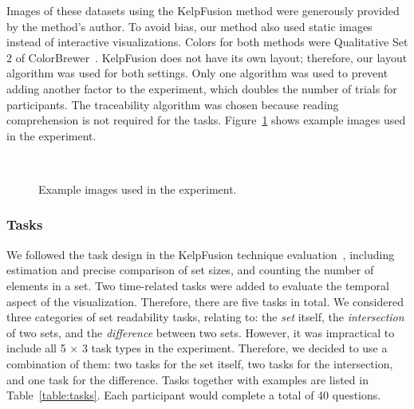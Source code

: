 
Images of these datasets using the KelpFusion method were generously provided by the method's author. To avoid bias, our method also used static images instead of interactive visualizations. Colors for both methods were Qualitative Set 2 of ColorBrewer~\cite{Harrower2003}. KelpFusion does not have its own layout; therefore, our layout algorithm was used for both settings. Only one algorithm was used to prevent adding another factor to the experiment, which doubles the number of trials for participants. The traceability algorithm was chosen because reading comprehension is not required for the tasks. Figure~\ref{fig:evaluation} shows example images used in the experiment. 

\begin{figure}[!htb]
	\centering
	\\
	\caption{Example images used in the experiment.}
	\label{fig:evaluation}
\end{figure}

\subsubsection{Tasks} We followed the task design in the KelpFusion technique evaluation~\cite{Meulemans2013}, including estimation and precise comparison of set sizes, and counting the number of elements in a set. Two time-related tasks were added to evaluate the temporal aspect of the  visualization. Therefore, there are five tasks in total. We considered three categories of set readability tasks, relating to: the \textit{set} itself, the \textit{intersection} of two sets, and the \textit{difference} between two sets. However, it was impractical to include all 5 $\times$ 3 task types in the experiment. Therefore, we decided to use a combination of them: two tasks for the set itself, two tasks for the intersection, and one task for the difference. Tasks together with examples are listed in Table~\ref{table:tasks}. Each participant would complete a total of 40 questions.

